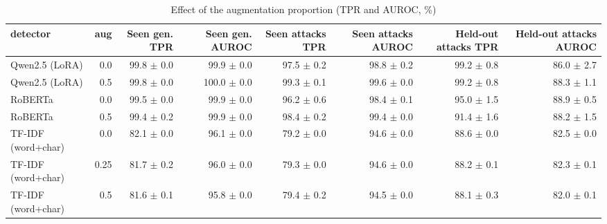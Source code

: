 \begin{table}[!t]
\centering
\caption{Effect of the augmentation proportion (TPR and AUROC, \%)}
\label{tab:augmentation}
\footnotesize
\begin{tabular}{lrrrrrrr}
\toprule
\textbf{detector} & \textbf{aug} & \textbf{Seen gen. TPR} & \textbf{Seen gen. AUROC} & \textbf{Seen attacks TPR} & \textbf{Seen attacks AUROC} & \textbf{Held-out attacks TPR} & \textbf{Held-out attacks AUROC} \\
\midrule
Qwen2.5 (LoRA) & 0.0 & 99.8 $\pm$ 0.0 & 99.9 $\pm$ 0.0 & 97.5 $\pm$ 0.2 & 98.8 $\pm$ 0.2 & 99.2 $\pm$ 0.8 & 86.0 $\pm$ 2.7 \\
Qwen2.5 (LoRA) & 0.5 & 99.8 $\pm$ 0.0 & 100.0 $\pm$ 0.0 & 99.3 $\pm$ 0.1 & 99.6 $\pm$ 0.0 & 99.2 $\pm$ 0.8 & 88.3 $\pm$ 1.1 \\
RoBERTa & 0.0 & 99.5 $\pm$ 0.0 & 99.9 $\pm$ 0.0 & 96.2 $\pm$ 0.6 & 98.4 $\pm$ 0.1 & 95.0 $\pm$ 1.5 & 88.9 $\pm$ 0.5 \\
RoBERTa & 0.5 & 99.4 $\pm$ 0.2 & 99.9 $\pm$ 0.0 & 98.4 $\pm$ 0.2 & 99.4 $\pm$ 0.0 & 91.4 $\pm$ 1.6 & 88.2 $\pm$ 1.5 \\
TF-IDF (word+char) & 0.0 & 82.1 $\pm$ 0.0 & 96.1 $\pm$ 0.0 & 79.2 $\pm$ 0.0 & 94.6 $\pm$ 0.0 & 88.6 $\pm$ 0.0 & 82.5 $\pm$ 0.0 \\
TF-IDF (word+char) & 0.25 & 81.7 $\pm$ 0.2 & 96.0 $\pm$ 0.0 & 79.3 $\pm$ 0.0 & 94.6 $\pm$ 0.0 & 88.2 $\pm$ 0.1 & 82.3 $\pm$ 0.1 \\
TF-IDF (word+char) & 0.5 & 81.6 $\pm$ 0.1 & 95.8 $\pm$ 0.0 & 79.4 $\pm$ 0.2 & 94.5 $\pm$ 0.0 & 88.1 $\pm$ 0.3 & 82.0 $\pm$ 0.1 \\
\bottomrule
\end{tabular}
\end{table}
